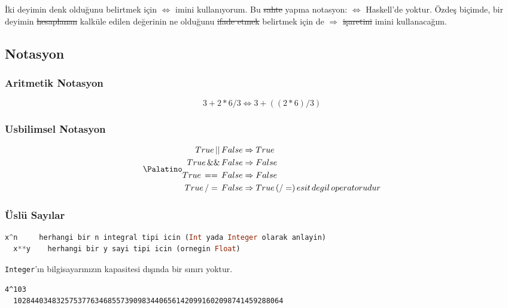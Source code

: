 \documentclass[a4paper,14pt,openany]{extbook} %
\begin{document}
İki deyimin denk olduğunu belirtmek için $\Leftrightarrow$ imini
kullanıyorum. Bu \st{sahte} yapma notasyon: $\Leftrightarrow$ %
Haskell'de yoktur.
Özdeş biçimde, bir deyimin \st{hesaplanan} kalküle edilen değerinin ne olduğunu
\st{ifade etmek} belirtmek için de $\Rightarrow$ \st{işaretini} imini kullanacağım.

\subsection{Notasyon}\label{notasyon}

\subsubsection{Aritmetik Notasyon}\label{aritmetik}

\begingroup\Palatino
$$
3 + 2 * 6 / 3 \Leftrightarrow 3 + ((2*6)/3)
$$
\endgroup

\subsubsection{Usbilimsel Notasyon}\label{mantux131ksal}

\begingroup
$$
\Palatino
\begin{aligned}
True\, ||\,   False   &\Rightarrow True\\
True\, \&\&\, False   &\Rightarrow False\\
True\, ==\,   False   &\Rightarrow False\\
True\, /=\,   False   &\Rightarrow True\, (/=)\, esit\, degil\, operatorudur
\end{aligned}
$$
\endgroup

\subsubsection{Üslü Sayılar}\label{uxfcsluxfc-sayux131lar}

\begin{lstlisting}[language=Haskell]
  x^n     herhangi bir n integral tipi icin (Int yada Integer olarak anlayin)
  x**y    herhangi bir y sayi tipi icin (ornegin Float)
\end{lstlisting}

\lstinline!Integer!'ın bilgisayarınızın kapasitesi dışında bir sınırı
yoktur.

\begin{lstlisting}[language=shell,numbers=none,nolol]
  4^103
  102844034832575377634685573909834406561420991602098741459288064
\end{lstlisting}
\end{document}
